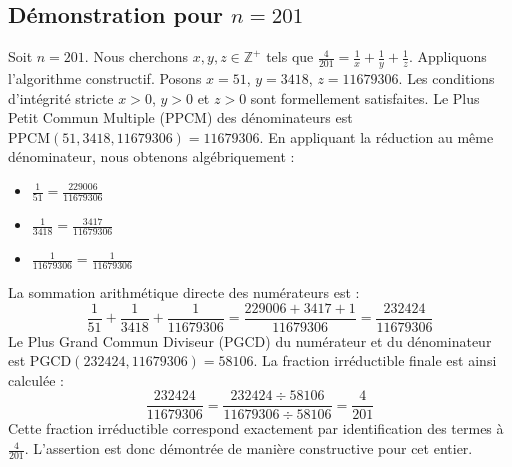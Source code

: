 \documentclass[11pt,a4paper]{article}
\begin{document}
\subsection{Démonstration pour $n = 201$}
Soit $n = 201$. Nous cherchons $x, y, z \in \mathbb{Z}^{+}$ tels que $\frac{4}{201} = \frac{1}{x} + \frac{1}{y} + \frac{1}{z}$.
Appliquons l'algorithme constructif. Posons $x = 51$, $y = 3418$, $z = 11679306$.
Les conditions d'intégrité stricte $x > 0$, $y > 0$ et $z > 0$ sont formellement satisfaites.
Le Plus Petit Commun Multiple (PPCM) des dénominateurs est $\text{PPCM}(51, 3418, 11679306) = 11679306$.
En appliquant la réduction au même dénominateur, nous obtenons algébriquement :
\begin{itemize}
    \item $\frac{1}{51} = \frac{229006}{11679306}$
    \item $\frac{1}{3418} = \frac{3417}{11679306}$
    \item $\frac{1}{11679306} = \frac{1}{11679306}$
\end{itemize}
La sommation arithmétique directe des numérateurs est :
$$ \frac{1}{51} + \frac{1}{3418} + \frac{1}{11679306} = \frac{229006 + 3417 + 1}{11679306} = \frac{232424}{11679306} $$
Le Plus Grand Commun Diviseur (PGCD) du numérateur et du dénominateur est $\text{PGCD}(232424, 11679306) = 58106$.
La fraction irréductible finale est ainsi calculée :
$$ \frac{232424}{11679306} = \frac{232424 \div 58106}{11679306 \div 58106} = \frac{4}{201} $$
Cette fraction irréductible correspond exactement par identification des termes à $\frac{4}{201}$. L'assertion est donc démontrée de manière constructive pour cet entier.
\end{document}
